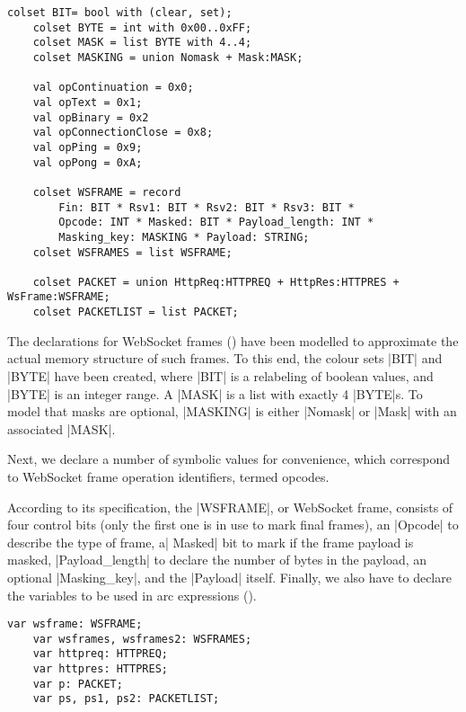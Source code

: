 	\begin{lstlisting}[label=lst:client_lib_colset_ws,caption=WebSocket colour
	sets,gobble=1,float] 
	colset BIT= bool with (clear, set);
	colset BYTE = int with 0x00..0xFF;
	colset MASK = list BYTE with 4..4;
	colset MASKING = union Nomask + Mask:MASK;
	
	val opContinuation = 0x0;
	val opText = 0x1;
	val opBinary = 0x2
	val opConnectionClose = 0x8;
	val opPing = 0x9;
	val opPong = 0xA;
	
	colset WSFRAME = record
		Fin: BIT * Rsv1: BIT * Rsv2: BIT * Rsv3: BIT * 
		Opcode: INT * Masked: BIT * Payload_length: INT * 
		Masking_key: MASKING * Payload: STRING;
	colset WSFRAMES = list WSFRAME;
	
	colset PACKET = union HttpReq:HTTPREQ + HttpRes:HTTPRES + WsFrame:WSFRAME;
	colset PACKETLIST = list PACKET;
	\end{lstlisting}
	
	The declarations for WebSocket frames () have
	been modelled to approximate the actual memory structure of such frames. To this
	end, the colour sets |BIT| and |BYTE| have been created, where |BIT| is a
	relabeling of boolean values, and |BYTE| is an integer range. A |MASK| is a
	list with exactly 4 |BYTE|s. To model that masks are optional, |MASKING| is
	either |Nomask| or |Mask| with an associated |MASK|.
	
	Next, we declare a number of symbolic values for convenience, which correspond
	to WebSocket frame operation identifiers, termed opcodes. 
	
	According to its specification, the |WSFRAME|, or WebSocket frame, consists
	of four control bits (only the first one is in use to mark final frames), an
	|Opcode| to describe the type of frame, a| Masked| bit to mark if the frame
	payload is masked, |Payload_length| to declare the number of bytes in the
	payload, an optional |Masking_key|, and the |Payload| itself. Finally, we
	also have to declare the variables to be used in arc expressions
	().
	
	\begin{lstlisting}[label=lst:client_lib_vars,caption=WebSocket
	Module Variables,gobble=1,float=h] 
	var wsframe: WSFRAME;
	var wsframes, wsframes2: WSFRAMES;
	var httpreq: HTTPREQ;
	var httpres: HTTPRES;
	var p: PACKET;
	var ps, ps1, ps2: PACKETLIST;
	\end{lstlisting}
	
